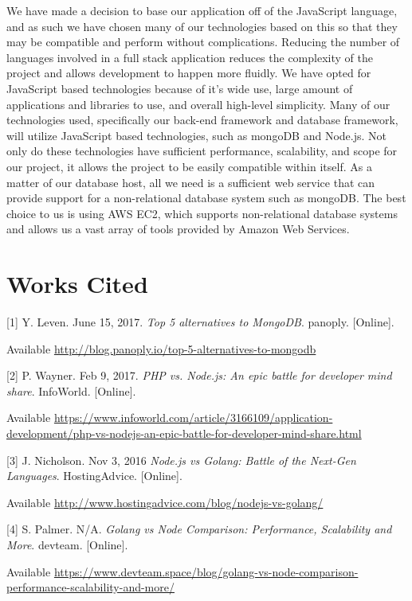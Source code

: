 \documentclass[onecolumn, draftclsnofoot,10pt, compsoc]{IEEEtran}
\begin{document}
	We have made a decision to base our application off of the JavaScript language, and as such we have chosen many of our technologies based on this
	so that they may be compatible and perform without complications. Reducing the number of languages involved in a full stack application reduces the complexity of
	the project and allows development to happen more fluidly. We have opted for JavaScript based technologies because of it's wide use, large amount of
	applications and libraries to use, and overall high-level simplicity. Many of our technologies used, specifically our back-end framework and database framework, 
	will utilize JavaScript based technologies, such as mongoDB and Node.js. Not only do these technologies have sufficient performance, scalability, and scope for our project, it allows the 
	project to be easily compatible within itself. As a matter of our database host, all we need is a sufficient web service that can provide support for a 
	non-relational database system such as mongoDB. The best choice to us is using AWS EC2, which supports non-relational database systems 
	and allows us a vast array of tools provided by Amazon Web Services. 


	
\section{Works Cited}

[1] Y. Leven. June 15, 2017. \textit{Top 5 alternatives to MongoDB}. panoply. [Online].

Available \url{http://blog.panoply.io/top-5-alternatives-to-mongodb}


[2] P. Wayner. Feb 9, 2017. \textit{PHP vs. Node.js: An epic battle for developer mind share}. InfoWorld. [Online].

Available \url{https://www.infoworld.com/article/3166109/application-development/php-vs-nodejs-an-epic-battle-for-developer-mind-share.html}


[3] J. Nicholson. Nov 3, 2016 \textit{Node.js vs Golang: Battle of the Next-Gen Languages}. HostingAdvice. [Online]. 

Available \url{http://www.hostingadvice.com/blog/nodejs-vs-golang/}


[4]	S. Palmer. N/A. \textit{Golang vs Node Comparison: Performance, Scalability and More}. devteam. [Online]. 

Available \url{https://www.devteam.space/blog/golang-vs-node-comparison-performance-scalability-and-more/}
\end{document}
